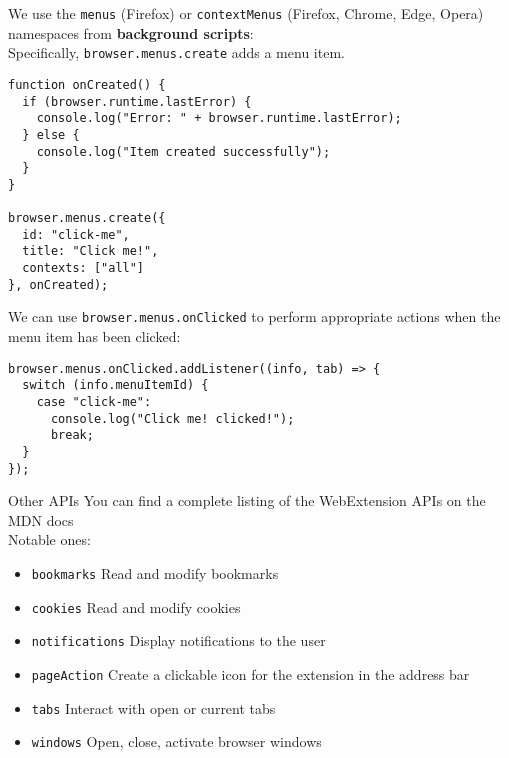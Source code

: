 \documentclass[../index.tex]{subfiles}
\begin{document}
\begin{frame}[fragile]{\currenttitle}
  We use the \texttt{menus} (Firefox) or \texttt{contextMenus} (Firefox,
  Chrome, Edge, Opera) namespaces from \textbf{background scripts}: \\[1em]

  Specifically, \texttt{browser.menus.create} adds a menu item.
\end{frame}

\begin{frame}[fragile]{\currenttitle}
  \begin{lstlisting}[language=ES6]
function onCreated() {
  if (browser.runtime.lastError) {
    console.log("Error: " + browser.runtime.lastError);
  } else {
    console.log("Item created successfully");
  }
}

browser.menus.create({
  id: "click-me",
  title: "Click me!",
  contexts: ["all"]
}, onCreated);
  \end{lstlisting}
\end{frame}

\begin{frame}[fragile]{\currenttitle}
  We can use \texttt{browser.menus.onClicked} to perform appropriate actions
  when the menu item has been clicked: \\[1em]
  \begin{lstlisting}[language=ES6]
browser.menus.onClicked.addListener((info, tab) => {
  switch (info.menuItemId) {
    case "click-me":
      console.log("Click me! clicked!");
      break;
  }
});
  \end{lstlisting}
\end{frame}

\renewcommand{\currenttitle}{Other APIs}
\begin{frame}[fragile]{\currenttitle}
  You can find a complete listing of the WebExtension APIs on the MDN
  docs\footnotemark{} \\[1em]

  Notable ones:
  \begin{itemize}
    \footnotesize
    \item \texttt{bookmarks} \textendash{} Read and modify bookmarks
    \item \texttt{cookies} \textendash{} Read and modify cookies
    \item \texttt{notifications} \textendash{} Display notifications to the
          user
    \item \texttt{pageAction} \textendash{} Create a clickable icon for the
          extension in the address bar
    \item \texttt{tabs} \textendash{} Interact with open or current tabs
    \item \texttt{windows} \textendash{} Open, close, activate browser windows
  \end{itemize}

\end{frame}

\end{document}
